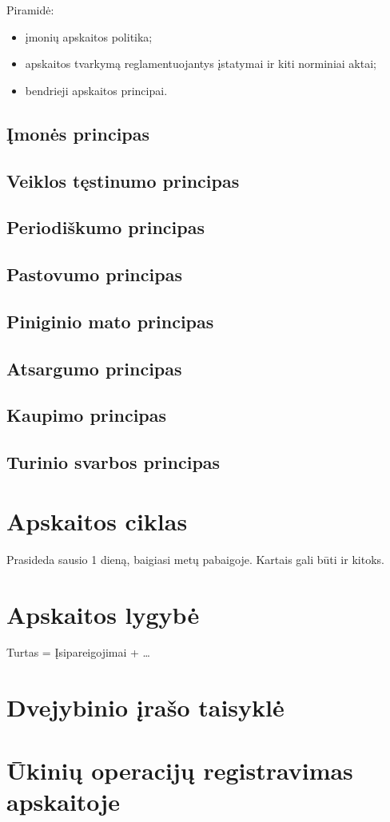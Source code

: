 Piramidė:
\begin{itemize}
  \item įmonių apskaitos politika;
  \item apskaitos tvarkymą reglamentuojantys įstatymai ir kiti norminiai
    aktai;
  \item bendrieji apskaitos principai.
\end{itemize}

\subsection{Įmonės principas}

\subsection{Veiklos tęstinumo principas}

\subsection{Periodiškumo principas}

\subsection{Pastovumo principas}

\subsection{Piniginio mato principas}

\subsection{Atsargumo principas}

\subsection{Kaupimo principas}

\subsection{Turinio svarbos principas}

\section{Apskaitos ciklas}

Prasideda sausio 1 dieną, baigiasi metų pabaigoje. Kartais gali būti
ir kitoks.

\section{Apskaitos lygybė}

Turtas = Įsipareigojimai + …

\section{Dvejybinio įrašo taisyklė}

\section{Ūkinių operacijų registravimas apskaitoje}
